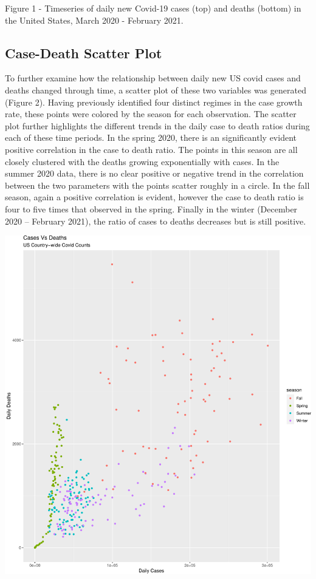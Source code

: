 \documentclass[11pt,]{article}
\begin{document}
\begin{center}
Figure 1 - Timeseries of daily new Covid-19 cases (top) and deaths (bottom) in the United States, March 2020 - February 2021.
\end{center}

\hypertarget{case-death-scatter-plot}{%
\subsection{Case-Death Scatter Plot}\label{case-death-scatter-plot}}

To further examine how the relationship between daily new US covid cases
and deaths changed through time, a scatter plot of these two variables
was generated (Figure 2). Having previously identified four distinct
regimes in the case growth rate, these points were colored by the season
for each observation. The scatter plot further highlights the different
trends in the daily case to death ratios during each of these time
periods. In the spring 2020, there is an significantly evident positive
correlation in the case to death ratio. The points in this season are
all closely clustered with the deaths growing exponentially with cases.
In the summer 2020 data, there is no clear positive or negative trend in
the correlation between the two parameters with the points scatter
roughly in a circle. In the fall season, again a positive correlation is
evident, however the case to death ratio is four to five times that
observed in the spring. Finally in the winter (December 2020 -- February
2021), the ratio of cases to deaths decreases but is still positive.

\includegraphics{figs/unnamed-chunk-3.pdf}
\end{document}
